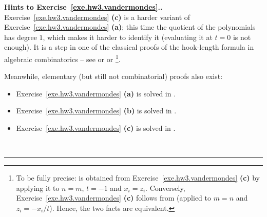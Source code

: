 \documentclass[numbers=enddot,12pt,final,onecolumn,notitlepage]{scrartcl}%
\theoremstyle{definition}
\newenvironment{proof}[1][Proof]{\noindent\textbf{#1.} }{\ \rule{0.5em}{0.5em}}
\begin{document}
\begin{proof}[Hints to Exercise~\ref{exe.hw3.vandermondes}.]
Exercise~\ref{exe.hw3.vandermondes} \textbf{(c)} is a harder variant
of Exercise~\ref{exe.hw3.vandermondes} \textbf{(a)}; this time the
quotient of the polynomials has degree $1$, which makes it harder to
identify it (evaluating it at $t=0$ is not enough).
It is a step in one of the classical proofs of the hook-length formula
in algebraic combinatorics -- see \cite[\S 4.3, Exercise
10]{Fulton-Young} or \cite[Lemma 4.13]{Uecker16}
or \cite[Lemma 2]{GlaNg04}\footnote{To be fully
  precise: \cite[Lemma 2]{GlaNg04} is obtained from
  Exercise~\ref{exe.hw3.vandermondes} \textbf{(c)} by applying it to
  $n = m$, $t = -1$ and $x_i = z_i$. Conversely,
  Exercise~\ref{exe.hw3.vandermondes} \textbf{(c)} follows from
  \cite[Lemma 2]{GlaNg04} (applied to $m = n$ and $z_i = -x_i / t$).
  Hence, the two facts are equivalent.}.

Meanwhile, elementary (but still not combinatorial) proofs also exist:
\begin{itemize}
\item Exercise~\ref{exe.hw3.vandermondes} \textbf{(a)} is solved in
      \cite[Proposition 7.192]{detnotes}.
\item Exercise~\ref{exe.hw3.vandermondes} \textbf{(b)} is solved in
      \cite[Proposition 7.194]{detnotes}.
\item Exercise~\ref{exe.hw3.vandermondes} \textbf{(c)} is solved in
      \cite[Exercise 6.34]{detnotes}.
\end{itemize}
\end{proof}
\end{document}
